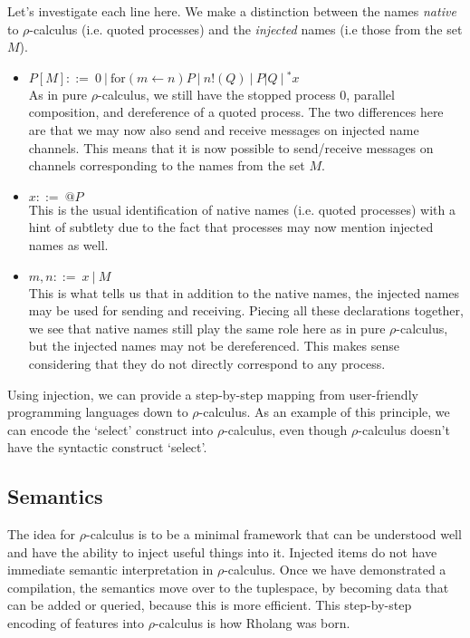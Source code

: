 \documentclass[12pt]{article}
\numberwithin{equation}{section}
\begin{document}
Let's investigate each line here. We make a distinction between the names \emph{native} to $\rho$-calculus (i.e. quoted processes) and the \emph{injected} names (i.e those from the set $M$).
\begin{itemize}
\item $P[M] ::= \ 0 \ | \ \text{for}(m \leftarrow n)P \ | \ n!(Q) \ | \ P|Q \ | \ {}^*x $ \\
As in pure $\rho$-calculus, we still have the stopped process $0$, parallel composition, and dereference of a quoted process. The two differences here are that we may now also send and receive messages on injected name channels. This means that it is now possible to send/receive messages on channels corresponding to the names from the set $M$.

\item $x ::= \ @P$ \\
This is the usual identification of native names (i.e. quoted processes) with a hint of subtlety due to the fact that processes may now mention injected names as well.

\item $m,n ::= \ x \ | \ M$ \\
This is what tells us that in addition to the native names, the injected names may be used for sending and receiving. Piecing all these declarations together, we see that native names still play the same role here as in pure $\rho$-calculus, but the injected names may not be dereferenced. This makes sense considering that they do not directly correspond to any process.
\end{itemize}

Using injection, we can provide a step-by-step mapping from user-friendly programming languages down to $\rho$-calculus. As an example of this principle, we can encode the `select' construct into $\rho$-calculus, even though $\rho$-calculus doesn't have the syntactic construct `select'.


\subsection{Semantics}
The idea for $\rho$-calculus is to be a minimal framework that can be understood well and have the ability to inject useful things into it. Injected items do not have immediate semantic interpretation in $\rho$-calculus. Once we have demonstrated a compilation, the semantics move over to the tuplespace, by becoming data that can be added or queried, because this is more efficient. This step-by-step encoding of features into $\rho$-calculus is how Rholang was born.
\end{document}
